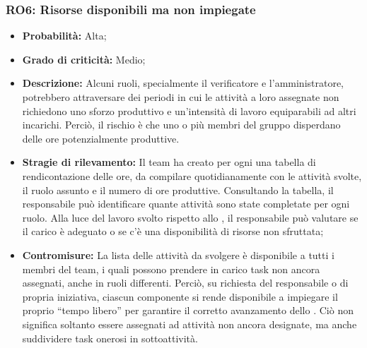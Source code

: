 \subsubsection{RO6: Risorse disponibili ma non impiegate}
\begin{itemize}
    \item \textbf{Probabilità:} Alta;
    \item \textbf{Grado di criticità:} Medio;
    \item \textbf{Descrizione:} Alcuni ruoli, specialmente il verificatore e l'amministratore, potrebbero attraversare dei periodi in cui le attività a loro assegnate non richiedono uno sforzo produttivo e un'intensità di lavoro equiparabili ad altri incarichi. Perciò, il rischio è che uno o più membri del gruppo disperdano delle ore potenzialmente produttive.
    \item \textbf{Stragie di rilevamento:} Il team ha creato per ogni  una tabella di rendicontazione delle ore, da compilare quotidianamente con le attività svolte, il ruolo assunto e il numero di ore produttive. Consultando la tabella, il responsabile può identificare quante attività sono state completate per ogni ruolo. Alla luce del lavoro svolto rispetto allo , il responsabile può valutare se il carico è adeguato o se c'è una disponibilità di risorse non sfruttata;
    \item \textbf{Contromisure:} La lista delle attività da svolgere è disponibile a tutti i membri del team, i quali possono prendere in carico task non ancora assegnati, anche in ruoli differenti. Perciò, su richiesta del responsabile o di propria iniziativa, ciascun componente si rende disponibile a impiegare il proprio “tempo libero” per garantire il corretto avanzamento dello . Ciò non significa soltanto essere assegnati ad attività non ancora designate, ma anche suddividere task onerosi in sottoattività. 
\end{itemize}
